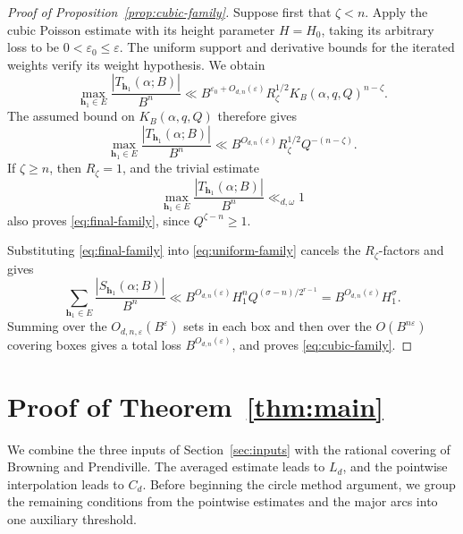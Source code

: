\documentclass[reqno,a4paper,11pt]{amsart}
\numberwithin{equation}{section}
\newcommand{\h}{\mathbf h}
\newcommand{\eps}{\varepsilon}
\theoremstyle{plain}
\theoremstyle{definition}
\begin{document}
\begin{proof}[Proof of Proposition~\ref{prop:cubic-family}]
Suppose first that \(\zeta<n\).
Apply the cubic Poisson estimate \cite[Lemma~3.4]{bp} with its height parameter \(H=H_0\), taking its arbitrary loss to be \(0<\eps_0\leq\eps\).
The uniform support and derivative bounds for the iterated weights verify its weight hypothesis.
We obtain
\[
 \max_{\h_1\in E}
 \frac{|T_{\h_1}(\alpha;B)|}{B^n} \ll
 B^{\eps_0+O_{d,n}(\eps)}R_\zeta^{1/2}
 K_B(\alpha,q,Q)^{n-\zeta}.
\]
The assumed bound on \(K_B(\alpha,q,Q)\) therefore gives
\begin{equation}\label{eq:final-family}
 \max_{\h_1\in E}
 \frac{|T_{\h_1}(\alpha;B)|}{B^n}
 \ll B^{O_{d,n}(\eps)}
 R_\zeta^{1/2}Q^{-(n-\zeta)}.
\end{equation}
If \(\zeta\geq n\), then \(R_\zeta=1\), and the trivial estimate
\[
 \max_{\h_1\in E}\frac{|T_{\h_1}(\alpha;B)|}{B^n}
 \ll_{d,\omega}1
\]
also proves \eqref{eq:final-family}, since \(Q^{\zeta-n}\geq1\).

Substituting \eqref{eq:final-family} into \eqref{eq:uniform-family} cancels the \(R_\zeta\)-factors and gives
\[
 \sum_{\h_1\in E}
 \frac{|S_{\h_1}(\alpha;B)|}{B^n}
 \ll B^{O_{d,n}(\eps)}H_1^n
 Q^{(\sigma-n)/2^{r-1}}
 =B^{O_{d,n}(\eps)}H_1^\sigma.
\]
Summing over the \(O_{d,n,\eps}(B^\eps)\) sets in each box and then over the \(O(B^{n\eps})\) covering boxes gives a total loss \(B^{O_{d,n}(\eps)}\), and proves \eqref{eq:cubic-family}.
\end{proof}

\section{Proof of Theorem~\ref{thm:main}}

We combine the three inputs of Section~\ref{sec:inputs} with the rational covering of Browning and Prendiville.
The averaged estimate leads to \(L_d\), and the pointwise interpolation leads to \(C_d\).
Before beginning the circle method argument, we group the remaining conditions from the pointwise estimates and the major arcs into one auxiliary threshold.
\end{document}
